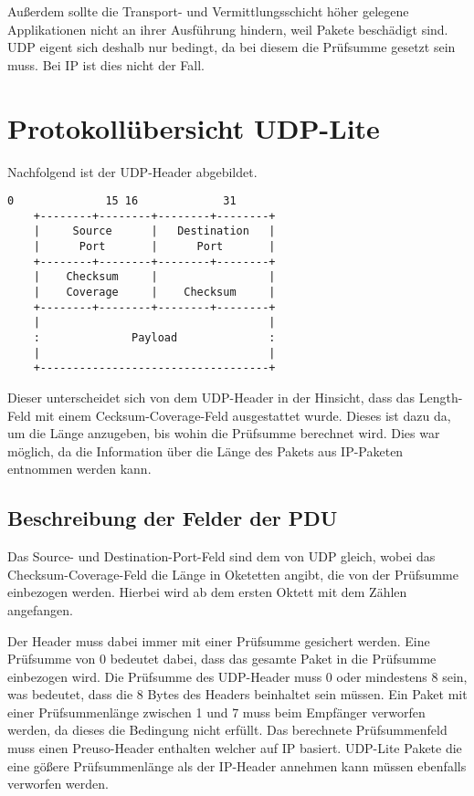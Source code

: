 \documentclass{template}
\begin{document}
Außerdem sollte die Transport- und Vermittlungsschicht höher gelegene
Applikationen nicht an ihrer Ausführung hindern, weil Pakete beschädigt sind.
UDP eigent sich deshalb nur bedingt, da bei diesem die Prüfsumme gesetzt
sein muss. Bei IP ist dies nicht der Fall.



\section{Protokollübersicht {\secit UDP-Lite}}

Nachfolgend ist der UDP-Header abgebildet.

\begin{lstlisting}[linewidth=0.47\textwidth]
     0              15 16             31
    +--------+--------+--------+--------+
    |     Source      |   Destination   |
    |      Port       |      Port       |
    +--------+--------+--------+--------+
    |    Checksum     |                 |
    |    Coverage     |    Checksum     |
    +--------+--------+--------+--------+
    |                                   |
    :              Payload              :
    |                                   |
    +-----------------------------------+
\end{lstlisting}
\cite{rfc:udplite}

Dieser unterscheidet sich von dem UDP-Header in der Hinsicht, dass
das Length-Feld mit einem Cecksum-Coverage-Feld ausgestattet wurde.
Dieses ist dazu da, um die Länge anzugeben, bis wohin die Prüfsumme
berechnet wird. Dies war möglich, da die Information über die Länge
des Pakets aus IP-Paketen entnommen werden kann.

\subsection{Beschreibung der Felder der PDU}

Das Source- und Destination-Port-Feld sind dem von UDP gleich, wobei
das Checksum-Coverage-Feld die Länge in Oketetten angibt, die von
der Prüfsumme einbezogen werden. Hierbei wird ab dem ersten Oktett
mit dem Zählen angefangen. 

Der Header muss dabei immer mit einer Prüfsumme gesichert werden.
Eine Prüfsumme von 0 bedeutet dabei, dass das gesamte Paket in die
Prüfsumme einbezogen wird. Die Prüfsumme des UDP-Header muss 0 oder
mindestens 8 sein, was bedeutet, dass die 8 Bytes des Headers beinhaltet
sein müssen. Ein Paket mit einer Prüfsummenlänge zwischen 1 und 7 muss
beim Empfänger verworfen werden, da dieses die Bedingung nicht erfüllt.
Das berechnete Prüfsummenfeld muss einen Preuso-Header enthalten welcher
auf IP basiert. UDP-Lite Pakete die eine gößere Prüfsummenlänge als
der IP-Header annehmen kann müssen ebenfalls verworfen werden.
\end{document}
